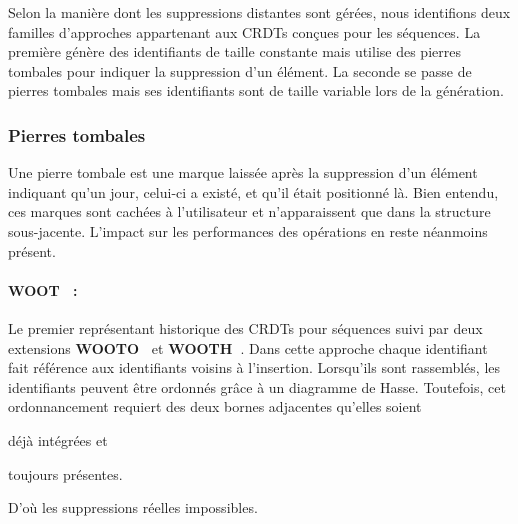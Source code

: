 
Selon la manière dont les suppressions distantes sont gérées, nous identifions
deux familles d'approches appartenant aux CRDTs conçues pour les séquences. La
première génère des identifiants de taille constante mais utilise des pierres
tombales pour indiquer la suppression d'un élément. La seconde se passe de
pierres tombales mais ses identifiants sont de taille variable lors de la
génération.

\subsubsection{Pierres tombales}

Une pierre tombale est une marque laissée après la suppression d'un élément
indiquant qu'un jour, celui-ci a existé, et qu'il était positionné là. Bien
entendu, ces marques sont cachées à l'utilisateur et n'apparaissent que dans la
structure sous-jacente. L'impact sur les performances des opérations en reste
néanmoins présent.

\paragraph{WOOT~\cite{oster2006data} :} Le premier représentant historique des
CRDTs pour séquences suivi par deux extensions
\textbf{WOOTO~\cite{weiss2007wooki}} et
\textbf{WOOTH~\cite{ahmed2011evaluating}}. Dans cette approche chaque
identifiant fait référence aux identifiants voisins à l'insertion.  Lorsqu'ils
sont rassemblés, les identifiants peuvent être ordonnés grâce à un diagramme de
Hasse. Toutefois, cet ordonnancement requiert des deux bornes adjacentes
qu'elles soient
\begin{inparaenum}[(i)]
\item déjà intégrées et
\item toujours présentes.
\end{inparaenum}
D'où les suppressions réelles impossibles.

